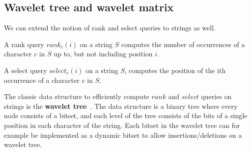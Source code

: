 \subsection*{Wavelet tree and wavelet matrix}

We can extend the notion of rank and select queries to strings as well. 

\begin{definition}

    A rank query $rank_c(i)$ on a string $S$ computes the number of occurrences of a
    character $c$ in $S$ up to, but not including position $i$.

\end{definition}
\begin{definition}

    A select query $select_c(i)$ on a string $S$, computes the position of the ith
    occurrence of a character $c$ in $S$. 

\end{definition}

The classic data structure to efficiently compute $rank$ and $select$ queries on strings
is the \textbf{wavelet tree}~\cite{WaveletTree}. The data structure is a binary tree where every
node consists of a bitset, and each level of the tree consists of the bits of a single
position in each character of the string. Each bitset in the wavelet tree can for example
be implemented as a dynamic bitset to allow insertions/deletions on a wavelet tree.

